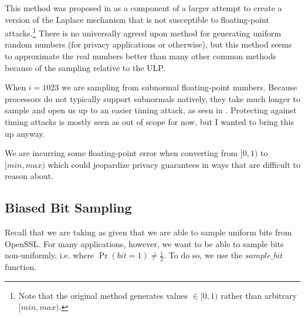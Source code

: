 \documentclass[11pt]{scrartcl} %
\begin{document}
This method was proposed in \cite{Mir12} as a component of a larger attempt to create
a version of the Laplace mechanism that is not susceptible to floating-point attacks.\footnote{Note that the
original method generates values $\in [0,1)$ rather than arbitrary $[min, max)$.}
There is no universally agreed upon method for generating uniform random numbers (for privacy
applications or otherwise), but this method seems to approximate the real numbers better than many
other common methods because of the sampling relative to the ULP. \newline

\begin{tcolorbox}[colback = {green}, title = {Known Privacy Issues}, colbacktitle = black]
	When $i=1023$ we are sampling from subnormal floating-point numbers. Because processors do not typically support
	subnormals natively, they take much longer to sample and open us up to an easier timing attack, as
	seen in \cite{AKM+15}.
	Protecting against timing attacks is mostly seen as out of scope for now, but I wanted
	to bring this up anyway. \newline

	We are incurring some floating-point error when converting from $[0,1)$ to $[min, max)$ which
	could jeopardize privacy guarantees in ways that are difficult to reason about.\cite{Mir12} \cite{Ilv19}
\end{tcolorbox}

\subsection{Biased Bit Sampling}
Recall that we are taking as given that we are able to sample uniform bits from OpenSSL.
For many applications, however, we want to be able to sample bits non-uniformly,
i.e. where $\Pr(bit = 1) \neq \frac{1}{2}$. To do so, we use the $sample\_bit$ function.
\end{document}
